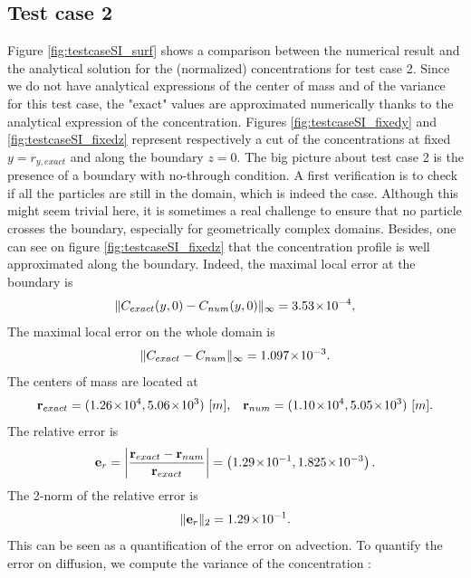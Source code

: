 \subsection*{Test case 2}
Figure \ref{fig:testcaseSI_surf} shows a comparison between the numerical result and the analytical solution for the (normalized) concentrations for test case 2. Since we do not have analytical expressions of the center of mass and of the variance for this test case, the "exact" values are approximated numerically thanks to the analytical expression of the concentration. Figures \ref{fig:testcaseSI_fixedy} and \ref{fig:testcaseSI_fixedz} represent respectively a cut of the concentrations at fixed $y = r_{y,exact}$ and along the boundary $z = 0$. The big picture about test case 2 is the presence of a boundary with no-through condition. A first verification is to check if all the particles are still in the domain, which is indeed the case. Although this might seem trivial here, it is sometimes a real challenge to ensure that no particle crosses the boundary, especially for geometrically complex domains. Besides, one can see on figure \ref{fig:testcaseSI_fixedz} that the concentration profile is well approximated along the boundary. Indeed, the maximal local error at the boundary is
\begin{equation}
	\|C_{exact}(y,0)-C_{num}(y,0)\|_{\infty} = 3.53\!\times\!10^{-4}, 
\end{equation}
The maximal local error on the whole domain is 
\begin{equation}
	\|C_{exact}-C_{num}\|_{\infty} = 1.097\!\times\!10^{-3}.
\end{equation}
The centers of mass are located at
\begin{equation}
	\b r_{exact} = (1.26\e{4},5.06\e{3}) \mbox{ [$m$],}\quad \b r_{num} = (1.10\e{4},5.05\e{3}) \mbox{ [$m$]}.
\end{equation}
The relative error is
\begin{equation}
	\mathbf e_r = \left \lvert \frac{\mathbf r_{exact}-\mathbf r_{num}}{\mathbf r_{exact}} \right \rvert =  \left(1.29\!\times\!10^{-1}, 1.825\!\times\!10^{-3}\right).
\end{equation}
The 2-norm of the relative error is
\begin{equation}
	\| \mathbf e_r \|_2 = 1.29\!\times\!10^{-1}.
\end{equation}
This can be seen as a quantification of the error on advection. To quantify the error on diffusion, we compute the variance of the concentration :
